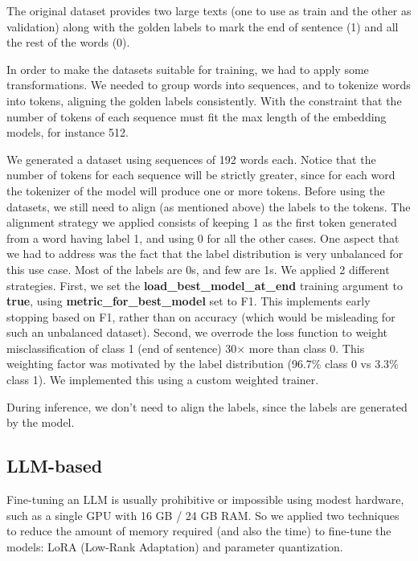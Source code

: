 \documentclass[11pt]{article}
\begin{document}
The original dataset provides two large texts (one to use as train and the other as validation) along with the golden labels to mark the end of sentence (1) and all the rest of the words (0).

In order to make the datasets suitable for training, we had to apply some transformations. 
We needed to group words into sequences, and to tokenize words into tokens, aligning the golden labels consistently.
With the constraint that the number of tokens of each sequence must fit the max length of the embedding models,
for instance 512.

We generated a dataset using sequences of 192 words each. Notice that the number of tokens for each sequence will be strictly greater,
since for each word the tokenizer of the model will produce one or more tokens. \newline Before using the datasets, we still need to align (as mentioned above) the labels to the tokens.
The alignment strategy we applied consists of keeping 1 as the first token generated from a word
having label 1, and using 0 for all the other cases. \newline One aspect that we had to address was the fact that the label distribution is very unbalanced
for this use case. Most of the labels are 0s, and few are 1s. We applied 2 different strategies. \newline First, we set the \textbf{load\_best\_model\_at\_end} training argument to \textbf{true},
using \textbf{metric\_for\_best\_model} set to F1. This implements early stopping based on F1,
rather than on accuracy (which would be misleading for such an unbalanced dataset). \newline Second, we overrode the loss function to weight misclassification of class 1 (end of sentence) 30× more than class 0. 
This weighting factor was motivated by the label distribution (96.7\% class 0 vs 3.3\% class 1). 
We implemented this using a custom weighted trainer. 

During inference, we don't need to align the labels, since the labels are generated by the model.

\subsection{LLM-based}

Fine-tuning an LLM is usually prohibitive or impossible using modest hardware, such as a single GPU with 16 GB / 24 GB RAM. So we applied two techniques to reduce the amount of memory required (and also the time) to fine-tune the models: LoRA (Low-Rank Adaptation) and parameter quantization.
\end{document}
